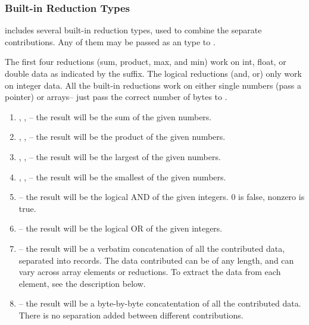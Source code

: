 \subsubsection{Built-in Reduction Types}
\label{builtin_reduction}

\charmpp{} includes several built-in reduction types, used to combine 
the separate contributions.  Any of them may be passed as an
 type to .

The first four reductions (sum, product, max, and min) work on int,
float, or double data as indicated by the suffix.  The logical
reductions (and, or) only work on integer data.  All the built-in
reductions work on either single numbers (pass a pointer) or arrays-- just
pass the correct number of bytes to .

\begin{enumerate}

\item {}, , -- the
result will be the sum of the given numbers.

\item {}, ,
-- the result will be the product of the given numbers.

\item {}, , -- the
result will be the largest of the given numbers.

\item {}, , -- the
result will be the smallest of the given numbers.

\item {}-- the result will be the logical AND of the given
integers.  0 is false, nonzero is true.

\item {}-- the result will be the logical OR of the given
integers.

\item {}-- the result will be a verbatim concatenation of
all the contributed data, separated into  records.
The data contributed can be of any length, and can vary across array elements
or reductions.  To extract the data from each element, see the description
below.

\item {}-- the result will be a byte-by-byte
concatentation of all the contributed data.  There is no separation
added between different contributions.

\end{enumerate}


